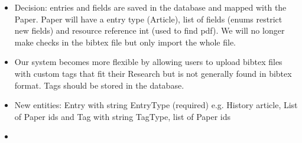 \begin{itemize}
	\item Decision: entries and fields are saved in the database and mapped with the Paper. Paper will have a entry type (Article), list of fields (enums restrict new fields) and resource reference int (used to find pdf). We will no longer make checks in the bibtex file but only import the whole file. 
	\item Our system becomes more flexible by allowing users to upload bibtex files with custom tags that fit their Research but is not generally found in bibtex format. Tags should be stored in the database. 
	\item New entities: Entry with string EntryType (required) e.g. History article, List of Paper ids and Tag with string TagType, list of Paper ids 
	\item 
\end{itemize}